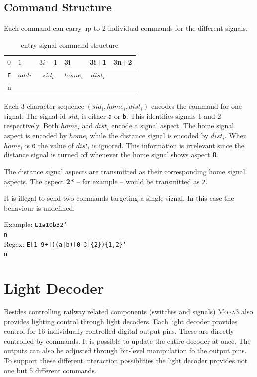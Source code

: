 \documentclass{scrreprt}
\newcommand\n{\char`\\n}
\begin{document}
\subsection{Command Structure}
Each command can carry up to 2 individual commands for the different signals.

\begin{table}[ht!]
\centering
\begin{tabular}{ |c|c||c|c|c||c| } 
\multicolumn{1}{l}{$0$} & \multicolumn{1}{l}{$1$} & \multicolumn{1}{l}{$3i-1$} & \multicolumn{1}{l}{3i} & \multicolumn{1}{c}{3i+1} & \multicolumn{1}{l}{3n+2} \\\hline
\texttt{E} & $addr$ & $sid_i$ & $home_i$ & $dist_i$ & \texttt{\n} \\\hline
\end{tabular}
\caption{entry signal command structure}
\end{table}

Each 3 character sequence $(sid_i, home_i, dist_i)$ encodes the command for one signal.
The signal id $sid_i$ is either \texttt{a} or \texttt{b}.
This identifies signals 1 and 2 respectively.
Both $home_i$ and $dist_i$ encode a signal aspect.
The home signal aspect is encoded by $home_i$ while the distance signal is encoded by $dist_i$.
When $home_i$ is \texttt{0} the value of $dist_i$ is ignored.
This information is irrelevant since the distance signal is turned off whenever the home signal shows aspect \textbf{0}.

The distance signal aspects are transmitted as their corresponding home signal aspects.
The aspect \textbf{2*} -- for example -- would be transmitted as \texttt{2}.

It is illegal to send two commands targeting a single signal.
In this case the behaviour is undefined.

Example: \texttt{E1a10b32\n} \\
Regex: \texttt{E[1-9+]((a|b)[0-3]\{2\})\{1,2\}\n}

\section{Light Decoder}
Besides controlling railway related components (switches and signals) \textsc{Moba3} also provides lighting control through light decoders.
Each light decoder provides control for 16 individually controlled digital output pins.
These are directly controlled by commands.
It is possible to update the entire decoder at once.
The outputs can also be adjusted through bit-level manipulation fo the output pins.
To support these different interaction possiblities the light decoder provides not one but 5 different commands.
\end{document}
